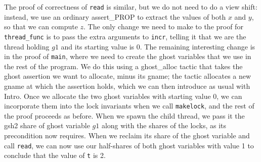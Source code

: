 \documentclass[11pt]{article}
\begin{document}
The proof of correctness of \texttt{read} is similar, but we do not need to do a view shift: instead, we use an ordinary \textsf{assert\_PROP} to extract the values of both $x$ and $y$, so that we can compute $z$. The only change we need to make to the proof for \texttt{thread\_func} is to pass the extra arguments to \texttt{incr}, telling it that we are the thread holding $g1$ and its starting value is 0. The remaining interesting change is in the proof of \texttt{main}, where we need to create the ghost variables that we use in the rest of the program. We do this using a \textsf{ghost\_alloc} tactic that takes the ghost assertion we want to allocate, minus its \textsf{gname}; the tactic allocates a new \textsf{gname} at which the assertion holds, which we can then introduce as usual with \textsf{Intro}. Once we allocate the two ghost variables with starting value 0, we can incorporate them into the lock invariants when we call \texttt{makelock}, and the rest of the proof proceeds as before. When we spawn the child thread, we pass it the \textsf{gsh2} share of ghost variable $g1$ along with the shares of the locks, as its precondition now requires. When we reclaim its share of the ghost variable and call \texttt{read}, we can now use our half-shares of both ghost variables with value 1 to conclude that the value of \texttt{t} is 2.
\end{document}
